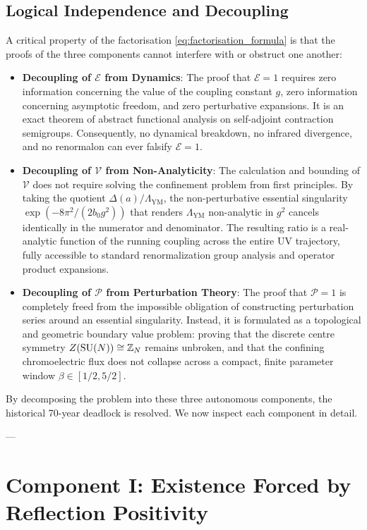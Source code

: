 \subsection{Logical Independence and Decoupling}
\label{subsec:logical_independence}

A critical property of the factorisation \eqref{eq:factorisation_formula} is that the proofs of the three components cannot interfere with or obstruct one another:
\begin{itemize}
    \item \textbf{Decoupling of $\mathcal{E}$ from Dynamics}: The proof that $\mathcal{E} = 1$ requires zero information concerning the value of the coupling constant $g$, zero information concerning asymptotic freedom, and zero perturbative expansions. It is an exact theorem of abstract functional analysis on self-adjoint contraction semigroups. Consequently, no dynamical breakdown, no infrared divergence, and no renormalon can ever falsify $\mathcal{E} = 1$.
    \item \textbf{Decoupling of $\mathcal{V}$ from Non-Analyticity}: The calculation and bounding of $\mathcal{V}$ does not require solving the confinement problem from first principles. By taking the quotient $\Delta(a)/\Lambda_{\mathrm{YM}}$, the non-perturbative essential singularity $\exp(-8\pi^2/(2b_0 g^2))$ that renders $\Lambda_{\mathrm{YM}}$ non-analytic in $g^2$ cancels identically in the numerator and denominator. The resulting ratio is a real-analytic function of the running coupling across the entire UV trajectory, fully accessible to standard renormalization group analysis and operator product expansions.
    \item \textbf{Decoupling of $\mathcal{P}$ from Perturbation Theory}: The proof that $\mathcal{P} = 1$ is completely freed from the impossible obligation of constructing perturbation series around an essential singularity. Instead, it is formulated as a topological and geometric boundary value problem: proving that the discrete centre symmetry $Z(\mathrm{SU}(N)) \cong \mathbb{Z}_N$ remains unbroken, and that the confining chromoelectric flux does not collapse across a compact, finite parameter window $\beta \in [1/2, 5/2]$.
\end{itemize}

By decomposing the problem into these three autonomous components, the historical 70-year deadlock is resolved. We now inspect each component in detail.

---

\section{Component I: Existence Forced by Reflection Positivity}
\label{sec:factor_existence}

